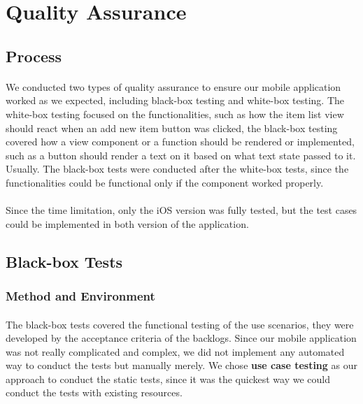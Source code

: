 \documentclass[12pt,a4paper]{article}
\begin{document}
    \section{Quality Assurance} %
      \label{chapter:Quality Assurance}
      
      \subsection{Process} %
        \paragraph{} We conducted two types of quality assurance to ensure our mobile application worked as we expected, including black-box testing and white-box testing. The white-box testing focused on the functionalities, such as how the item list view should react when an add new item button was clicked, the black-box testing covered how a view component or a function should be rendered or implemented, such as a button should render a text on it based on what text state passed to it. Usually. The black-box tests were conducted after the white-box tests, since the functionalities could be functional only if the component worked properly. 

        \paragraph{} Since the time limitation, only the iOS version was fully tested, but the test cases could be implemented in both version of the application.

      \subsection{Black-box Tests}
        \subsubsection{Method and Environment} %
          \paragraph{} The black-box tests covered the functional testing of the use scenarios, they were developed by the acceptance criteria of the backlogs. Since our mobile application was not really complicated and complex, we did not implement any automated way to conduct the tests but manually merely. We chose {\bf use case testing} as our approach to conduct the static tests, since it was the quickest way we could conduct the tests with existing resources.
          
\end{document}
